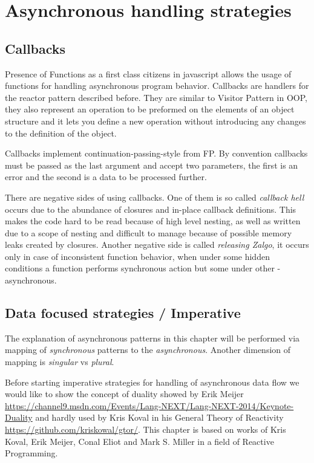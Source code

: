 \section{Asynchronous handling strategies}
\subsection{Callbacks}
Presence of Functions as a first class citizens in javascript allows the usage of functions for handling asynchronous program behavior. Callbacks are handlers for the reactor pattern described before. They are similar to Visitor Pattern in OOP, they also represent an operation to be preformed on the elements of an object structure and it lets you define a new operation without introducing any changes to the definition of the object. 

Callbacks implement continuation-passing-style from FP. By convention callbacks must be passed as the last argument and accept two parameters, the first is an error and the second is a data to be processed further.

There are negative sides of using callbacks. One of them is so called \textit{callback hell} occurs due to the abundance of closures and in-place callback definitions. This makes the code hard to be read because of high level nesting, as well as written due to a scope of nesting and difficult to manage because of possible memory leaks created by closures. Another negative side is called \textit{releasing Zalgo}\cite{zalgo}, it occurs only in case of inconsistent function behavior, when under some hidden conditions a function performs synchronous action but some under other - asynchronous.

\subsection{Data focused strategies / Imperative}
The explanation of asynchronous patterns in this chapter will be performed via mapping of \textit{synchronous} patterns to the \textit{asynchronous}. Another dimension of mapping is \textit{singular} vs \textit{plural}. 

Before starting imperative strategies for handling of asynchronous data flow we would like to show the concept of duality showed by Erik Meijer \url{https://channel9.msdn.com/Events/Lang-NEXT/Lang-NEXT-2014/Keynote-Duality} and hardly used by Kris Koval in his General Theory of Reactivity \url{https://github.com/kriskowal/gtor/}. This chapter is based on works of Kris Koval, Erik Meijer, Conal Eliot and Mark S. Miller in a field of Reactive Programming.\\

